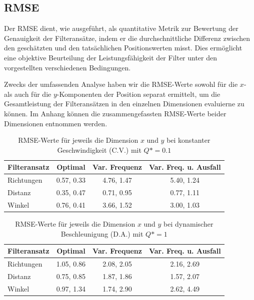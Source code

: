 \documentclass[conference]{IEEEtran}[10pt]
\begin{document}
\subsection{RMSE}

Der RMSE dient, wie ausgeführt, als quantitative Metrik zur Bewertung der Genauigkeit der Filteransätze, indem er die durchschnittliche Differenz zwischen den geschätzten und den tatsächlichen Positionswerten misst. Dies ermöglicht eine objektive Beurteilung der Leistungsfähigkeit der Filter unter den vorgestellten verschiedenen Bedingungen. 

Zwecks der umfassenden Analyse haben wir die RMSE-Werte sowohl für die \(x\)- als auch für die \(y\)-Komponenten der Position separat ermittelt, um die Gesamtleistung der Filteransätzen in den einzelnen Dimensionen evaluierne zu können. Im Anhang können die zusammengefassten RMSE-Werte beider Dimensionen entnommen werden.

\begin{table}[h]
\centering
\begin{tabular}{|l|c|c|c|}
\hline
\textbf{Filteransatz} & \textbf{Optimal} & \textbf{Var. Frequenz} & \textbf{Var. Freq. u. Ausfall}  \\ \hline
Richtungen & 0.57, 0.33 & 4.76, 1.47 & 5.40, 1.24 \\ \hline
Distanz    & 0.35, 0.47 & 0.71, 0.95 & 0.77, 1.11 \\ \hline
Winkel     & 0.76, 0.41 & 3.66, 1.52 & 3.00, 1.03 \\ \hline
\end{tabular}
\caption{RMSE-Werte für jeweils die Dimension \(x\) und \(y\) bei konstanter Geschwindigkeit (C.V.) mit $Q*=0.1$}
\label{tab:cvRMSE}
\end{table}



\begin{table}[h]
\centering
\begin{tabular}{|l|c|c|c|}
\hline
\textbf{Filteransatz} & \textbf{Optimal} & \textbf{Var. Frequenz} & \textbf{Var. Freq. u. Ausfall} \\ \hline
Richtungen & 1.05, 0.86 & 2.08, 2.05 & 2.16, 2.69 \\ \hline
Distanz    & 0.75, 0.85 & 1.87, 1.86 & 1.57, 2.07 \\ \hline
Winkel     & 0.97, 1.34 & 1.74, 2.90 & 2.62, 4.49 \\ \hline
\end{tabular}
\caption{RMSE-Werte für jeweils die Dimension \(x\) und \(y\) bei dynamischer Beschleunigung (D.A.) mit $Q*=1$}
\label{tab:daRMSE}
\end{table}
\end{document}

